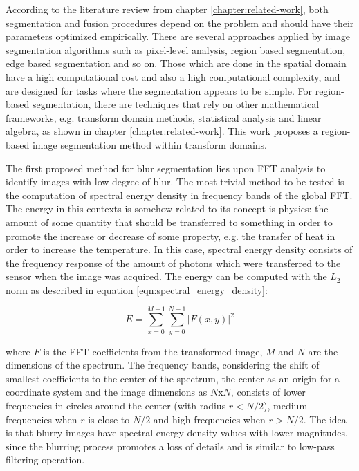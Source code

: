 According to the literature review from chapter \ref{chapter:related-work}, both segmentation and fusion procedures depend on the problem and should have their parameters optimized empirically. There are several approaches applied by image segmentation algorithms such as pixel-level analysis, region based segmentation, edge based segmentation and so on. Those which are done in the spatial domain have a high computational cost and also a high computational complexity, and are designed for tasks where the segmentation appears to be simple. For region-based segmentation, there are techniques that rely on other mathematical frameworks, e.g. transform domain methods, statistical analysis and linear algebra, as shown in chapter \ref{chapter:related-work}. This work proposes a region-based image segmentation method within transform domains.

The first proposed method for blur segmentation lies upon FFT analysis to identify images with low degree of blur. The most trivial method to be tested is the computation of spectral energy density in frequency bands of the global FFT. The energy in this contexts is somehow related to its concept is physics: the amount of some quantity that should be transferred to something in order to promote the increase or decrease of some property, e.g. the transfer of heat in order to increase the temperature. In this case, spectral energy density consists of the frequency response of the amount of photons which were transferred to the sensor when the image was acquired. The energy can be computed with the $L_{2}$ norm as described in equation \ref{eqn:spectral_energy_density}:

\begin{equation}
\label{eqn:spectral_energy_density}  
    E = \sum_{x=0}^{M-1}\sum_{y=0}^{N-1}|F(x,y)|^{2}
\end{equation}

\noindent where $F$ is the FFT coefficients from the transformed image, $M$ and $N$ are the dimensions of the spectrum. The frequency bands, considering the shift of smallest coefficients to the center of the spectrum, the center as an origin for a coordinate system and the image dimensions as $N$x$N$, consists of lower frequencies in circles around the center (with radius $r < N/2$), medium frequencies when $r$ is close to $N/2$ and high frequencies when $r > N/2$. The idea is that blurry images have spectral energy density values with lower magnitudes, since the blurring process promotes a loss of details and is similar to low-pass filtering operation.

